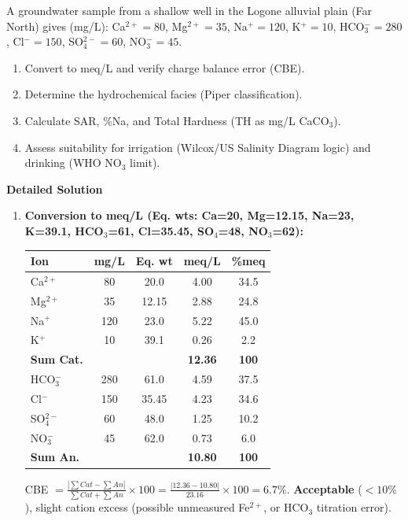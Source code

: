 \documentclass[11pt]{article}
\begin{document}
\begin{exoresolu}
A groundwater sample from a shallow well in the Logone alluvial plain (Far North) gives (mg/L):
Ca$^{2+}=80$, Mg$^{2+}=35$, Na$^+=120$, K$^+=10$, HCO$_3^-=280$, Cl$^-=150$, SO$_4^{2-}=60$, NO$_3^-=45$.
\begin{enumerate}
    \item Convert to meq/L and verify charge balance error (CBE).
    \item Determine the hydrochemical facies (Piper classification).
    \item Calculate SAR, \%Na, and Total Hardness (TH as mg/L CaCO$_3$).
    \item Assess suitability for irrigation (Wilcox/US Salinity Diagram logic) and drinking (WHO NO$_3$ limit).
\end{enumerate}
\tcblower
\textbf{Detailed Solution}
\begin{enumerate}
    \item \textbf{Conversion to meq/L (Eq. wts: Ca=20, Mg=12.15, Na=23, K=39.1, HCO$_3$=61, Cl=35.45, SO$_4$=48, NO$_3$=62):}
    \begin{center}
    \begin{tabular}{|l|c|c|c|c|}
    \hline
    Ion & mg/L & Eq. wt & meq/L & \%meq \\
    \hline
    Ca$^{2+}$ & 80 & 20.0 & 4.00 & 34.5 \\
    Mg$^{2+}$ & 35 & 12.15 & 2.88 & 24.8 \\
    Na$^+$ & 120 & 23.0 & 5.22 & 45.0 \\
    K$^+$ & 10 & 39.1 & 0.26 & 2.2 \\
    \hline
    \textbf{Sum Cat.} & & & \textbf{12.36} & \textbf{100} \\
    \hline
    HCO$_3^-$ & 280 & 61.0 & 4.59 & 37.5 \\
    Cl$^-$ & 150 & 35.45 & 4.23 & 34.6 \\
    SO$_4^{2-}$ & 60 & 48.0 & 1.25 & 10.2 \\
    NO$_3^-$ & 45 & 62.0 & 0.73 & 6.0 \\
    \hline
    \textbf{Sum An.} & & & \textbf{10.80} & \textbf{100} \\
    \hline
    \end{tabular}
    \end{center}
    CBE $= \frac{|\sum Cat - \sum An|}{\sum Cat + \sum An} \times 100 = \frac{|12.36 - 10.80|}{23.16} \times 100 = \mathbf{6.7\%}$.
    \textbf{Acceptable} ($< 10\%$), slight cation excess (possible unmeasured Fe$^{2+}$, or HCO$_3$ titration error).

\end{enumerate}
\end{exoresolu}
\end{document}
